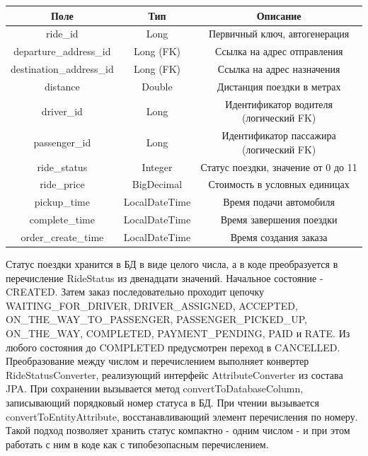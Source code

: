 {{\begin{Center}
      \begin{tabular}{|c|c|c|}
        \hline
        Поле & Тип & Описание \\ \hline
        ride\_id & Long & Первичный ключ, автогенерация \\ \hline
        departure\_address\_id & Long (FK) & Ссылка на адрес отправления \\ \hline
        destination\_address\_id & Long (FK) & Ссылка на адрес назначения \\ \hline
        distance & Double & Дистанция поездки в метрах \\ \hline
        driver\_id & Long & Идентификатор водителя (логический FK) \\ \hline
        passenger\_id & Long & Идентификатор пассажира (логический FK) \\ \hline
        ride\_status & Integer & Статус поездки, значение от 0 до 11 \\ \hline
        ride\_price & BigDecimal & Стоимость в условных единицах \\ \hline
        pickup\_time & LocalDateTime & Время подачи автомобиля \\ \hline
        complete\_time & LocalDateTime & Время завершения поездки \\ \hline
        order\_create\_time & LocalDateTime & Время создания заказа \\ \hline
    \end{tabular} \end{Center}}
  \botTablespace \addtocounter{tablecntr}{1}

  \par \redline Статус поездки хранится в БД в виде целого числа, а в коде преобразуется в перечисление RideStatus из двенадцати значений. Начальное состояние - CREATED. Затем заказ последовательно проходит цепочку WAITING\_FOR\_DRIVER, DRIVER\_ASSIGNED, ACCEPTED, ON\_THE\_WAY\_TO\_PASSENGER, PASSENGER\_PICKED\_UP, ON\_THE\_WAY, COMPLETED, PAYMENT\_PENDING, PAID и RATE. Из любого состояния до COMPLETED предусмотрен переход в CANCELLED. Преобразование между числом и перечислением выполняет конвертер RideStatusConverter, реализующий интерфейс AttributeConverter из состава JPA. При сохранении вызывается метод convertToDatabaseColumn, записывающий порядковый номер статуса в БД. При чтении вызывается convertToEntityAttribute, восстанавливающий элемент перечисления по номеру. Такой подход позволяет хранить статус компактно - одним числом - и при этом работать с ним в коде как с типобезопасным перечислением.

}
